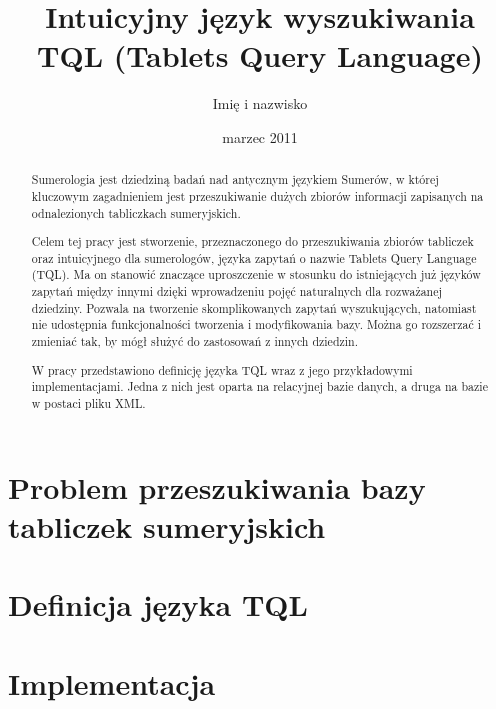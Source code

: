 \documentclass{pracamgr}
\author{Imię i nazwisko}
\title{Intuicyjny język wyszukiwania TQL (Tablets Query Language)}
\date{marzec 2011}
\begin{document}
\maketitle

\begin{abstract}
Sumerologia jest dziedziną badań nad antycznym językiem Sumerów, w której
kluczowym zagadnieniem jest przeszukiwanie dużych zbiorów informacji
zapisanych na odnalezionych tabliczkach sumeryjskich.

Celem tej pracy jest stworzenie, przeznaczonego do przeszukiwania zbiorów tabliczek 
oraz intuicyjnego dla sumerologów, języka zapytań o nazwie Tablets Query Language (TQL).
Ma on stanowić znaczące uproszczenie w stosunku do istniejących już języków 
zapytań między innymi dzięki wprowadzeniu pojęć naturalnych dla rozważanej dziedziny. 
Pozwala na tworzenie skomplikowanych zapytań wyszukujących, natomiast 
nie udostępnia funkcjonalności tworzenia i modyfikowania bazy. 
Można go rozszerzać i zmieniać tak, by mógł służyć do zastosowań z innych 
dziedzin.

W pracy przedstawiono definicję języka TQL wraz z jego przykładowymi implementacjami. 
Jedna z nich jest oparta na relacyjnej bazie danych, a druga na bazie w postaci pliku XML.

\end{abstract}

\tableofcontents

\part{Problem przeszukiwania bazy tabliczek sumeryjskich}




\part{Definicja języka TQL}


\part{Implementacja}





\end{document}
